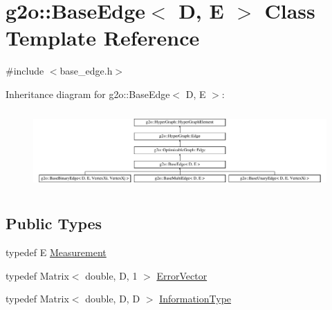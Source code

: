 \hypertarget{classg2o_1_1_base_edge}{}\section{g2o\+:\+:Base\+Edge$<$ D, E $>$ Class Template Reference}
\label{classg2o_1_1_base_edge}


{\ttfamily \#include $<$base\+\_\+edge.\+h$>$}

Inheritance diagram for g2o\+:\+:Base\+Edge$<$ D, E $>$\+:\begin{figure}[H]
\begin{center}
\leavevmode
\includegraphics[height=3.040174cm]{classg2o_1_1_base_edge}
\end{center}
\end{figure}
\subsection*{Public Types}
\begin{DoxyCompactItemize}
\item 
typedef E \mbox{\hyperlink{classg2o_1_1_base_edge_a2c148abba650a20b8c7eed75d3e2211e}{Measurement}}
\item 
typedef Matrix$<$ double, D, 1 $>$ \mbox{\hyperlink{classg2o_1_1_base_edge_af5b558dd24e4be2e437563cae4b3550d}{Error\+Vector}}
\item 
typedef Matrix$<$ double, D, D $>$ \mbox{\hyperlink{classg2o_1_1_base_edge_a2e5a33343ac3f189d8a7d5ee4d8b73fc}{Information\+Type}}
\end{DoxyCompactItemize}
